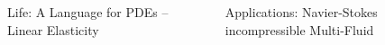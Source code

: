 \documentclass[final,utf8,,hyperref={pdfpagelabels=false}]{beamer}
\newcommand{\goodgap}{%
  \hspace{\subfigtopskip}%
  \hspace{\subfigbottomskip}}
\begin{document}
\begin{frame}[containsverbatim]{}
\begin{columns}[c]
\begin{block}{Life: A Language for PDEs -- Linear Elasticity}
\begin{tikzpicture}[transform shape, baseline=-3.5cm]
    \end{tikzpicture}

  \end{block}


  \begin{block}{Applications: Navier-Stokes incompressible Multi-Fluid}
    
    \begin{columns}[t]
      \begin{column}{.48\textwidth}
        \begin{figure}
      \centering
      \goodgap
      \\
      \goodgap

\end{figure}
\end{column}
\end{columns}
\end{block}
\end{columns}
\end{frame}
\end{document}
